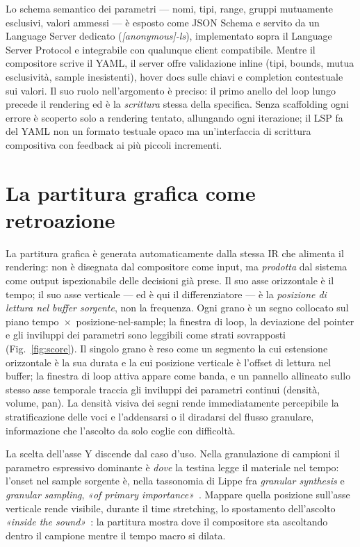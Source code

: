 \documentclass[10pt,twocolumn,a4paper]{article}
\begin{document}
Lo schema semantico dei parametri --- nomi, tipi, range, gruppi
mutuamente esclusivi, valori ammessi --- è esposto come JSON Schema e
servito da un Language Server dedicato (\emph{[anonymous]-ls}),
implementato sopra il Language Server Protocol e integrabile con
qualunque client compatibile. Mentre il compositore scrive il YAML, il
server offre validazione inline (tipi, bounds, mutua esclusività,
sample inesistenti), hover docs sulle chiavi e completion contestuale
sui valori. Il suo ruolo nell'argomento è preciso: il primo anello del
loop lungo precede il rendering ed è la \emph{scrittura} stessa della
specifica. Senza scaffolding ogni errore è scoperto solo a rendering
tentato, allungando ogni iterazione; il LSP fa del YAML non un formato
testuale opaco ma un'interfaccia di scrittura compositiva con feedback
ai più piccoli incrementi.

\section{La partitura grafica come retroazione}
\label{sec:partitura}

La partitura grafica è generata automaticamente dalla stessa IR che
alimenta il rendering: non è disegnata dal compositore come input, ma
\emph{prodotta} dal sistema come output ispezionabile delle decisioni
già prese. Il suo asse orizzontale è il tempo; il suo asse verticale ---
ed è qui il differenziatore --- è la \emph{posizione di lettura nel
buffer sorgente}, non la frequenza. Ogni grano è un segno collocato sul
piano tempo~$\times$~posizione-nel-sample; la finestra di loop, la
deviazione del pointer e gli inviluppi dei parametri sono leggibili come
strati sovrapposti (Fig.~\ref{fig:score}). Il singolo grano è reso come
un segmento la cui estensione orizzontale è la sua durata e la cui
posizione verticale è l'offset di lettura nel buffer; la finestra di
loop attiva appare come banda, e un pannello allineato sullo stesso asse
temporale traccia gli inviluppi dei parametri continui (densità, volume,
pan). La densità visiva dei segni rende immediatamente percepibile la
stratificazione delle voci e l'addensarsi o il diradarsi del flusso
granulare, informazione che l'ascolto da solo coglie con difficoltà.

La scelta dell'asse Y discende dal caso d'uso. Nella granulazione di
campioni il parametro espressivo dominante è \emph{dove} la testina
legge il materiale nel tempo: l'onset nel sample sorgente è, nella
tassonomia di Lippe fra \emph{granular synthesis} e \emph{granular
sampling}, \emph{«of primary importance»}~\cite{Lippe1993cim}. Mappare
quella posizione sull'asse verticale rende visibile, durante il time
stretching, lo spostamento dell'ascolto \emph{«inside the
sound»}~\cite{Truax2014}: la partitura mostra dove il compositore sta
ascoltando dentro il campione mentre il tempo macro si dilata.
\end{document}
